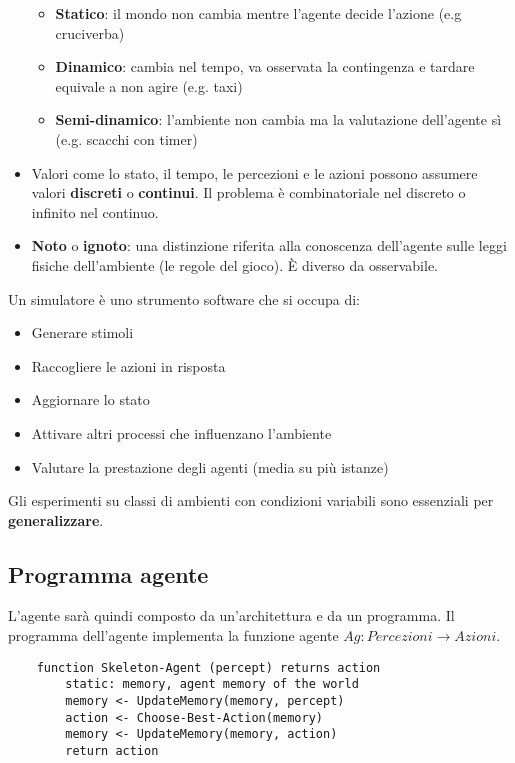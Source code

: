 \begin{itemize}
	\begin{itemize}
		\item \textbf{Statico}: il mondo non cambia mentre l’agente decide l’azione (e.g cruciverba)
		\item \textbf{Dinamico}: cambia nel tempo, va osservata la contingenza e tardare equivale a non agire (e.g. taxi)
		\item \textbf{Semi-dinamico}: l’ambiente non cambia ma la valutazione dell’agente sì (e.g. scacchi con timer)
	\end{itemize}
	\item Valori come lo stato, il tempo, le percezioni e le azioni possono assumere valori \textbf{discreti} o \textbf{continui}. Il problema è combinatoriale nel discreto o infinito nel continuo.
	\item \textbf{Noto} o \textbf{ignoto}: una distinzione riferita alla conoscenza dell'agente sulle leggi fisiche dell'ambiente (le regole del gioco). È diverso da osservabile.
\end{itemize}

\begin{definition}[Simulatore]
	Un simulatore è uno strumento software che si occupa di:
	\begin{itemize}
		\item Generare stimoli
		\item Raccogliere le azioni in risposta
		\item Aggiornare lo stato
		\item Attivare altri processi che influenzano l'ambiente
		\item Valutare la prestazione degli agenti (media su più istanze)
	\end{itemize}
	Gli esperimenti su classi di ambienti con condizioni variabili sono essenziali per \textbf{generalizzare}.
\end{definition}

\subsection{Programma agente}
L'agente sarà quindi composto da un'architettura e da un programma. Il programma dell'agente implementa la funzione agente $Ag: Percezioni \to Azioni$. 

\begin{lstlisting}
	function Skeleton-Agent (percept) returns action
		static: memory, agent memory of the world
		memory <- UpdateMemory(memory, percept)
		action <- Choose-Best-Action(memory)
		memory <- UpdateMemory(memory, action)
		return action
\end{lstlisting}

